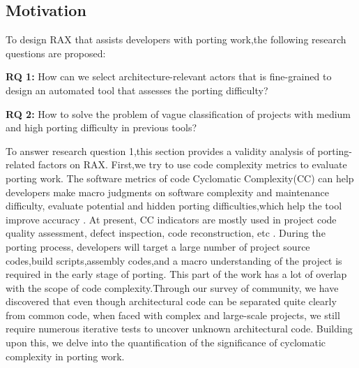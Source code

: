 \documentclass[sigconf,screen,review,anonymous]{acmart}
\begin{document}
\subsection{Motivation}
To design RAX that assists developers with porting work,the following research questions are proposed:

\textbf{RQ 1:} How can we select architecture-relevant actors that is fine-grained to design an automated tool that assesses the porting difficulty?

\textbf{RQ 2:} How to solve the problem of vague classification of projects with medium and high porting difficulty in previous tools?

To answer research question 1,this section provides a validity analysis of porting-related factors on RAX.
First,we try to use code complexity metrics to evaluate porting work.
The software metrics of code Cyclomatic Complexity(CC) can help developers make macro judgments on software complexity and maintenance difficulty, evaluate potential and hidden porting difficulties,which help the tool improve accuracy \cite{2005Exploring}.
At present, CC indicators are mostly used in project code quality assessment, defect inspection, code reconstruction, etc \cite{1991Cyclomatic}.
During the porting process, developers will target a large number of project source codes,build scripts,assembly codes,and a macro understanding of the project is required in the early stage of porting.
This part of the work has a lot of overlap with the scope of code complexity.Through our survey of community, we have discovered that even though architectural code can be separated quite clearly from common code, when faced with complex and large-scale projects, we still require numerous iterative tests to uncover unknown architectural code. Building upon this, we delve into the quantification of the significance of cyclomatic complexity in porting work.
\end{document}
